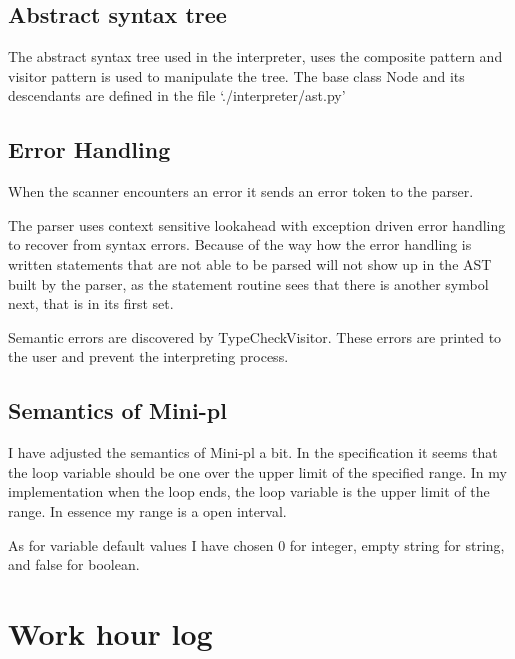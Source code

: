 \documentclass[12pt,a4paper]{article}
\begin{document}
\subsection{Abstract syntax tree}
The abstract syntax tree used in the interpreter, uses the composite pattern and visitor
pattern is used to manipulate the tree. The base class Node and its descendants are
defined in the file `./interpreter/ast.py'

\subsection{Error Handling}

When the scanner encounters an error it sends an error token to the parser.

The parser uses context sensitive lookahead with exception driven error
handling to recover from syntax errors. Because of the way how the error
handling is written statements that are not able to be parsed will not show up
in the AST built by the parser, as the statement routine sees that there is
another symbol next, that is in its first set.

Semantic errors are discovered by TypeCheckVisitor.
These errors are printed to the user and prevent the interpreting process.

\subsection{Semantics of Mini-pl}

I have adjusted the semantics of Mini-pl a bit. In the specification
it seems that the loop variable should be one over the upper limit of the 
specified range. In my implementation when the loop ends, the loop variable
is the upper limit of the range. In essence my range is a open interval.

As for variable default values I have chosen 0 for integer, empty string for string, and 
false for boolean.

\section{Work hour log}
\end{document}
